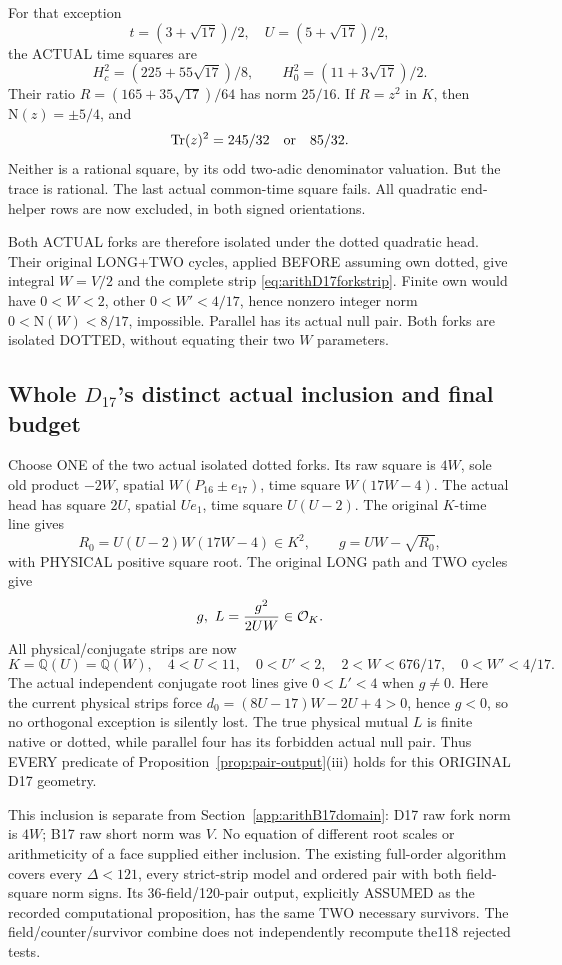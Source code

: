 For that exception
\[
 t=(3+\sqrt{17})/2,\quad U=(5+\sqrt{17})/2,
\]
the ACTUAL time squares are
\[
 H_c^2=(225+55\sqrt{17})/8,\qquad
 H_0^2=(11+3\sqrt{17})/2 .
\]
Their ratio
\(R=(165+35\sqrt{17})/64\) has norm \(25/16\).
If \(R=z^2\) in \(K\), then
\(\mathrm N(z)=\pm5/4\), and
\[
                    \operatorname{Tr}(z)^2=245/32
                                      \quad\hbox{or}\quad85/32 .
\]
Neither is a rational square, by its odd
two-adic denominator valuation.
But the trace is rational.
The last actual common-time square fails.
All quadratic end-helper rows are now excluded,
in both signed orientations.

Both ACTUAL forks are therefore isolated under
the dotted quadratic head.
Their original LONG+TWO cycles, applied BEFORE
assuming own dotted, give integral \(W=V/2\)
and the complete strip
\eqref{eq:arithD17forkstrip}.
Finite own would have \(0<W<2\), other
\(0<W'<4/17\), hence nonzero integer norm
\(0<\mathrm N(W)<8/17\), impossible.
Parallel has its actual null pair.
Both forks are isolated DOTTED, without
equating their two \(W\) parameters.

\subsection{Whole \(D_{17}\)'s distinct actual inclusion and final budget}
\label{app:arithD17domain}

Choose ONE of the two actual isolated dotted forks.
Its raw square is \(4W\), sole old product
\(-2W\), spatial \(W(P_{16}\pm e_{17})\),
time square \(W(17W-4)\).
The actual head has square \(2U\), spatial
\(Ue_1\), time square \(U(U-2)\).
The original \(K\)-time line gives
\[
 R_0=U(U-2)W(17W-4)\in K^2,\qquad
 g=UW-\sqrt{R_0},
\]
with PHYSICAL positive square root.
The original LONG path and TWO cycles give
\[
                   g,\ L={g^2\over2UW}\in\mathcal O_K .
\]
All physical/conjugate strips are now
\[
 K=\mathbb Q(U)=\mathbb Q(W),\quad
 4<U<11,\quad0<U'<2,\quad
 2<W<676/17,\quad0<W'<4/17 .
\]
The actual independent conjugate root lines give
\(0<L'<4\) when \(g\ne0\).
Here the current physical strips force
\(d_0=(8U-17)W-2U+4>0\), hence \(g<0\),
so no orthogonal exception is silently lost.
The true physical mutual \(L\) is finite
native or dotted, while parallel four has
its forbidden actual null pair.
Thus EVERY predicate of
Proposition~\ref{prop:pair-output}(iii) holds
for this ORIGINAL D17 geometry.

This inclusion is separate from
Section~\ref{app:arithB17domain}:
D17 raw fork norm is \(4W\);
B17 raw short norm was \(V\).
No equation of different root scales or
arithmeticity of a face supplied either inclusion.
The existing full-order algorithm covers every
\(\Delta<121\), every strict-strip model and
ordered pair with both field-square norm signs.
Its 36-field/120-pair output, explicitly ASSUMED
as the recorded computational proposition, has
the same TWO necessary survivors.
The field/counter/survivor combine does not
independently recompute the118 rejected tests.

